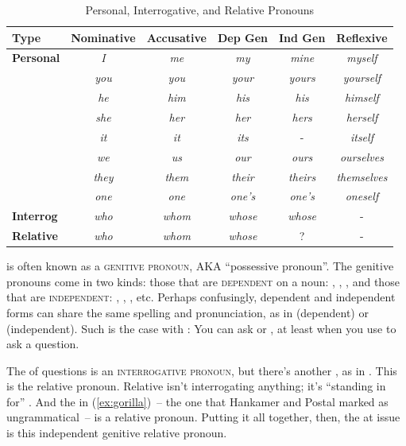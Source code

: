 \begin{table}[h]
\centering
\begin{tabular}{lccccc}
\hline
\textbf{Type} & \textbf{Nominative} & \textbf{Accusative} & \textbf{Dep Gen} & \textbf{Ind Gen} & \textbf{Reflexive} \\
\hline
\textbf{Personal} & \textit{I} & \textit{me} & \textit{my} & \textit{mine} & \textit{myself} \\
 & \textit{you} & \textit{you} & \textit{your} & \textit{yours} & \textit{yourself} \\
 & \textit{he} & \textit{him} & \textit{his} & \textit{his} & \textit{himself} \\
 & \textit{she} & \textit{her} & \textit{her} & \textit{hers} & \textit{herself} \\
 & \textit{it} & \textit{it} & \textit{its} & - & \textit{itself} \\
 & \textit{we} & \textit{us} & \textit{our} & \textit{ours} & \textit{ourselves} \\
 & \textit{they} & \textit{them} & \textit{their} & \textit{theirs} & \textit{themselves} \\
 & \textit{one} & \textit{one} & \textit{one's} & \textit{one's} & \textit{oneself} \\
\textbf{Interrog} & \textit{who} & \textit{whom} & \textit{whose} & \textit{whose} & - \\
\textbf{Relative} & \textit{who} & \textit{whom} & \textit{whose} & ? & - \\
\hline
\end{tabular}
\caption{Personal, Interrogative, and Relative Pronouns}
\label{tab:pronouns}
\end{table}

 is often known as a \textsc{genitive pronoun}, AKA \enquote{possessive pronoun}. The genitive pronouns come in two kinds: those that are \textsc{dependent} on a noun: , , , and those that are \textsc{independent}: , , , etc. Perhaps confusingly, dependent and independent forms can share the same spelling and pronunciation, as in  (dependent) or  (independent). Such is the case with : You can ask  or , at least when you use  to ask a question.

The  of questions is an \textsc{interrogative pronoun}, but there's another , as in . This is the {relative pronoun}. Relative  isn't interrogating anything; it's \enquote{standing in for} . And the  in (\ref{ex:gorilla})~-- the one that Hankamer and Postal marked as ungrammatical~-- is a relative pronoun. Putting it all together, then, the  at issue is this independent genitive relative pronoun.

